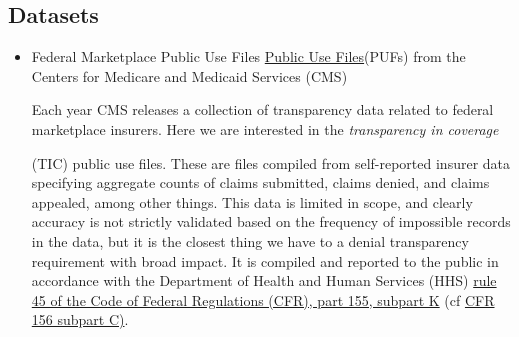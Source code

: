 \documentclass[12pt, a4paper,twoside]{report}
\theoremstyle{plain} %
\theoremstyle{definition} %
\theoremstyle{remark} %
\numberwithin{equation}{chapter}
\begin{document}
		\subsection{Datasets}\label{publicdata:datasets}
		
		\begin{itemize}
			\item Federal Marketplace Public Use Files \href{https://www.cms.gov/cciio/resources/data-resources/marketplace-puf}{Public Use Files}(PUFs) from the Centers for Medicare and Medicaid Services (CMS)\\
			
			\begin{tcolorbox}
			Each year CMS releases a collection of transparency data related to federal marketplace insurers. Here we are interested in the \emph{transparency in coverage}  
			(TIC) public use files. These are files compiled from self-reported insurer data specifying aggregate counts of claims submitted, claims denied, and claims appealed, among other things. This data is limited in scope, and clearly accuracy is not strictly validated based on the frequency of impossible records in the data, but it is the closest thing we have to a denial transparency requirement with broad impact. It is compiled and reported to the public in accordance with the Department of Health and Human Services (HHS) \href{https://www.ecfr.gov/current/title-45/subtitle-A/subchapter-B/part-155/subpart-K/section-155.1040}{rule 45 of the Code of Federal Regulations (CFR), part 155, subpart K} (cf \href{https://www.ecfr.gov/current/title-45/subtitle-A/subchapter-B/part-156/subpart-C/section-156.220}{CFR 156 subpart C)}.\\
			

\end{tcolorbox}
\end{itemize}
\end{document}
